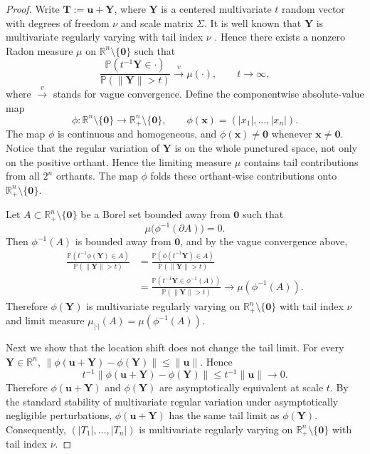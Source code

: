 \documentclass[12pt]{article}
\theoremstyle{plain}
\theoremstyle{plain}
\theoremstyle{definition}
\renewcommand{\Pr}{\mathbb{P}}
\begin{document}
\Absolutet*
\begin{proof}
Write
$\mathbf{T}:=\mathbf{u}+\mathbf{Y}$,
where $\mathbf{Y}$ is a centered multivariate $t$ random vector with
degrees of freedom $\nu$ and scale matrix $\Sigma$. It is well known that
$\mathbf Y$ is multivariate regularly varying with tail index $\nu$ \citep{nikoloulopoulos2009extreme}.
Hence there exists a nonzero Radon measure $\mu$ on
$\mathbb R^n\setminus\{\mathbf{0}\}$ such that
\[
\frac{\Pr(t^{-1}\mathbf{Y}\in \cdot)}
     {\Pr(\|\mathbf{Y}\|>t)}
\xrightarrow{v}
\mu(\cdot),
\qquad t\to\infty,
\]
where $\xrightarrow{v}$ stands for vague convergence.
Define the componentwise absolute-value map
\[
\phi:\mathbb R^n\setminus\{\boldsymbol 0\}
\to \mathbb R_+^n\setminus\{\boldsymbol 0\},
\qquad
\phi(\mathbf{x})=(|x_1|,\ldots,|x_n|).
\]
The map $\phi$ is continuous and homogeneous, and
$\phi(\mathbf{x})\neq \boldsymbol 0$ whenever
$\mathbf{x}\neq \boldsymbol 0$.  Notice that the regular variation of
$\mathbf{Y}$ is on the whole punctured space, not only on the positive
orthant. Hence the limiting measure $\mu$ contains tail contributions from
all $2^n$ orthants. The map $\phi$ folds these orthant-wise contributions
onto $\mathbb R_+^n\setminus\{\boldsymbol 0\}$.

Let $A\subset \mathbb R_+^n\setminus\{\boldsymbol 0\}$ be a Borel set
bounded away from $\boldsymbol 0$ such that
\[
\mu\bigl(\phi^{-1}(\partial A)\bigr)=0 .
\]
Then $\phi^{-1}(A)$ is bounded away from $\boldsymbol 0$, and by the vague
convergence above,
\[
\begin{aligned}
\frac{\Pr(t^{-1}\phi(\mathbf{Y})\in A)}
     {\Pr(\|\mathbf{Y}\|>t)}
&=
\frac{\Pr(\phi(t^{-1}\mathbf{Y})\in A)}
     {\Pr(\|\mathbf{Y}\|>t)} \\
&=
\frac{\Pr(t^{-1}\mathbf{Y}\in \phi^{-1}(A))}
     {\Pr(\|\mathbf{Y}\|>t)}
\longrightarrow
\mu(\phi^{-1}(A)).
\end{aligned}
\]
Therefore $\phi\left(\mathbf{Y}\right)$ is multivariate regularly varying on $\mathbb R_+^n\setminus\{\boldsymbol 0\}$ with tail index $\nu$ and limit measure $\mu_{|\cdot|}(A)=\mu(\phi^{-1}(A)).$

Next we show that the location shift does not change the tail limit.
For every $\mathbf{Y}\in\mathbb R^n$,
$\big\|\phi(\mathbf{u}+\mathbf{Y})-\phi(\mathbf{Y})\big\|
\le \|\mathbf{u}\|$.
Hence
\[
t^{-1}\big\|\phi(\mathbf{u}+\mathbf{Y})-\phi(\mathbf{Y})\big\|
\le t^{-1}{\|\mathbf{u}\|}\to 0.
\] Therefore $\phi(\mathbf{u}+\mathbf{Y})$ and
$\phi(\mathbf{Y})$ are asymptotically equivalent at scale $t$. By the
standard stability of multivariate regular variation under
asymptotically negligible perturbations, $\phi(\mathbf{u}+\mathbf{Y})$
has the same tail limit as $\phi(\mathbf{Y})$. Consequently,
$(|T_1|,\ldots,|T_n|)$
is multivariate regularly varying on
$\mathbb R_+^n\setminus\{\boldsymbol 0\}$ with tail index $\nu$.


\end{proof}
\end{document}
